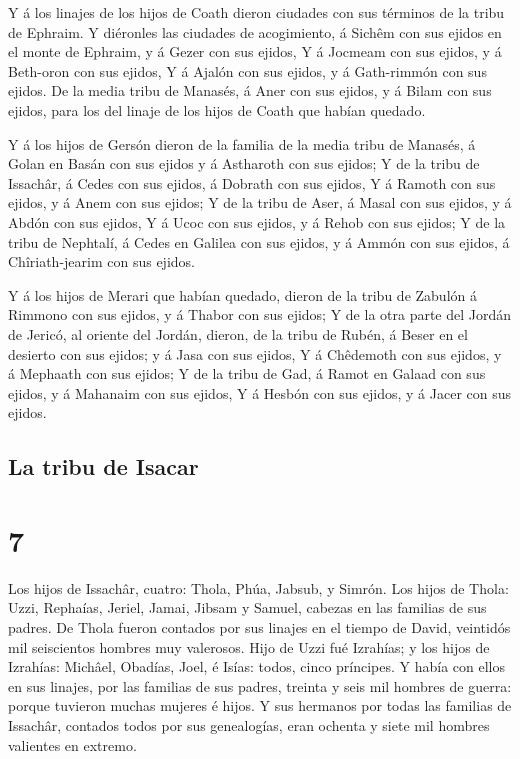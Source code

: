 Y á los linajes de los hijos de Coath dieron ciudades con
sus términos de la tribu de Ephraim.  Y diéronles las
ciudades de acogimiento, á Sichêm con sus ejidos en el monte de Ephraim,
y á Gezer con sus ejidos,  Y á Jocmeam con sus ejidos, y á
Beth-oron con sus ejidos,  Y á Ajalón con sus ejidos, y á
Gath-rimmón con sus ejidos.  De la media tribu de Manasés,
á Aner con sus ejidos, y á Bilam con sus ejidos, para los del linaje de
los hijos de Coath que habían quedado.

 Y á los hijos de Gersón dieron de la familia de la media
tribu de Manasés, á Golan en Basán con sus ejidos y á Astharoth con sus
ejidos;  Y de la tribu de Issachâr, á Cedes con sus ejidos,
á Dobrath con sus ejidos,  Y á Ramoth con sus ejidos, y á
Anem con sus ejidos;  Y de la tribu de Aser, á Masal con
sus ejidos, y á Abdón con sus ejidos,  Y á Ucoc con sus
ejidos, y á Rehob con sus ejidos;  Y de la tribu de
Nephtalí, á Cedes en Galilea con sus ejidos, y á Ammón con sus ejidos, á
Chîriath-jearim con sus ejidos.

 Y á los hijos de Merari que habían quedado, dieron de la
tribu de Zabulón á Rimmono con sus ejidos, y á Thabor con sus ejidos;
 Y de la otra parte del Jordán de Jericó, al oriente del
Jordán, dieron, de la tribu de Rubén, á Beser en el desierto con sus
ejidos; y á Jasa con sus ejidos,  Y á Chêdemoth con sus
ejidos, y á Mephaath con sus ejidos;  Y de la tribu de Gad,
á Ramot en Galaad con sus ejidos, y á Mahanaim con sus ejidos,
 Y á Hesbón con sus ejidos, y á Jacer con sus ejidos.

\hypertarget{la-tribu-de-isacar}{%
\subsection{La tribu de Isacar}\label{la-tribu-de-isacar}}

\hypertarget{section-6}{%
\section{7}\label{section-6}}

 Los hijos de Issachâr, cuatro: Thola, Phúa, Jabsub, y
Simrón.  Los hijos de Thola: Uzzi, Rephaías, Jeriel, Jamai,
Jibsam y Samuel, cabezas en las familias de sus padres. De Thola fueron
contados por sus linajes en el tiempo de David, veintidós mil
seiscientos hombres muy valerosos.  Hijo de Uzzi fué
Izrahías; y los hijos de Izrahías: Michâel, Obadías, Joel, é Isías:
todos, cinco príncipes.  Y había con ellos en sus linajes,
por las familias de sus padres, treinta y seis mil hombres de guerra:
porque tuvieron muchas mujeres é hijos.  Y sus hermanos por
todas las familias de Issachâr, contados todos por sus genealogías, eran
ochenta y siete mil hombres valientes en extremo.

